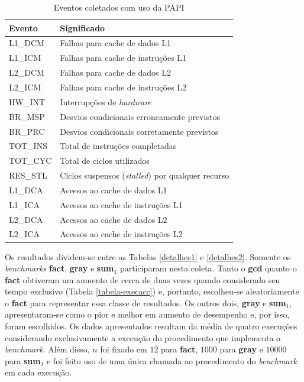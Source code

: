 \begin{table}[ht!]
  \caption{Eventos coletados com uso da PAPI \label{eventospapi}}
  \centering
  \begin{tabular}{l l}
    \toprule
    Evento & Significado \\
    \midrule
    L1\_DCM & Falhas para cache de dados L1 \\
    L1\_ICM & Falhas para cache de instruções L1 \\
    L2\_DCM & Falhas para cache de dados L2 \\
    L2\_ICM & Falhas para cache de instruções L2 \\
    HW\_INT & Interrupções de \textit{hardware} \\
    BR\_MSP & Desvios condicionais erroneamente previstos \\
    BR\_PRC & Desvios condicionais corretamente previstos \\
    TOT\_INS & Total de instruções completadas \\
    TOT\_CYC & Total de ciclos utilizados \\
    RES\_STL & Ciclos suspensos (\textit{stalled}) por qualquer recurso\\
    L1\_DCA & Acessos ao cache de dados L1 \\
    L1\_ICA & Acessos ao cache de instruções L1 \\
    L2\_DCA & Acessos ao cache de dados L2 \\
    L2\_ICA & Acessos ao cache de instruções L2 \\
    \bottomrule
  \end{tabular}
\end{table}

Os resultados dividem-se entre as Tabelas \ref{detalhes1} e
\ref{detalhes2}. Somente os \textit{benchmarks} \textbf{fact},
\textbf{gray} e \textbf{sum$_1$} participaram nesta coleta. Tanto o
\textbf{gcd} quanto o \textbf{fact} obtiveram um aumento de cerca de
duas vezes quando considerado seu tempo exclusivo (Tabela
\ref{tabela-execacc}) e, portanto, escolheu-se aleatoriamente o
\textbf{fact} para representar essa classe de resultados. Os outros
dois, \textbf{gray} e \textbf{sum$_1$}, apresentaram-se como o pior e
melhor em aumento de desempenho e, por isso, foram escolhidos.
Os dados apresentados resultam da média de quatro execuções
considerando exclusivamente a execução do procedimento que implementa
o \textit{benchmark}. Além disso, $n$ foi fixado em $12$ para
\textbf{fact}, $1000$ para \textbf{gray} e $10000$ para
\textbf{sum$_1$} e foi feito uso de uma única chamada ao procedimento
do \textit{benchmark} em cada execução.

